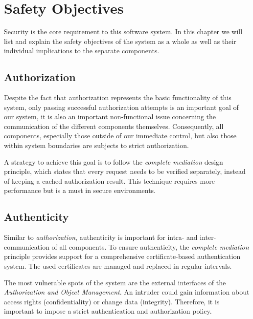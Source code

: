 \documentclass[12pt,a4paper,titlepage,oneside]{scrartcl}
\begin{document}
\maketitle
\setcounter{section}{0}
\setcounter{tocdepth}{2}
\tableofcontents

%
%

\section{Safety Objectives}
Security is the core requirement to this software system. In this chapter we will list and explain the safety objectives of the system as a whole as well as their individual implications to the separate components.

\subsection{Authorization}
Despite the fact that authorization represents the basic functionality of this system, only passing successful authorization attempts is an important goal of our system, it is also an important non-functional issue concerning the communication of the different components themselves. Consequently, all components, especially those outside of our immediate control, but also those within system boundaries are subjects to strict authorization.

A strategy to achieve this goal is to follow the \emph{complete mediation} design principle, which states that every request needs to be verified separately, instead of keeping a cached authorization result. This technique requires more performance but is a must in secure environments.

\subsection{Authenticity}
Similar to \emph{authorization}, authenticity is important for intra- and inter-communication of all components. To ensure authenticity, the \emph{complete mediation} principle provides support for a comprehensive certificate-based authentication system. The used certificates are managed and replaced in regular intervals.

The most vulnerable spots of the system are the external interfaces of the \emph{Authorization and Object Management}. An intruder could gain information about access rights (confidentiality) or change data (integrity). Therefore, it is important to impose a strict authentication and authorization policy.
\end{document}
